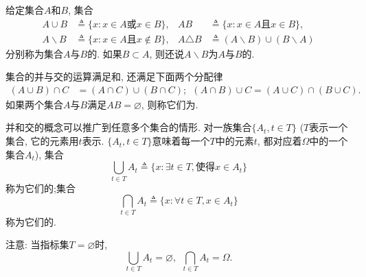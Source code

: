 给定集合$A$和$B$, 集合
\begin{align}
A\cup B &\triangleq \{ x: x\in A\text{或} x\in B\},&AB &\triangleq \{ x: x\in A\text{且} x\in B\},\nonumber\\
A\backslash B &\triangleq \{ x:x\in A\text{且}x\notin B \},&A\triangle B &\triangleq (A\backslash B)\cup(B\backslash A)
\end{align}
分别称为集合$A$与$B$的. 如果$B\subset A$, 则还说$A\backslash B$为$A$与$B$的.

集合的并与交的运算满足和, 还满足下面两个分配律\begin{align}
(A\cup B)\cap C &= (A\cap C)\cup (B\cap C);~~(A\cap B)\cup C = (A\cup C)\cap (B\cup C).
\end{align}
如果两个集合$A$与$B$满足$AB = \varnothing$, 则称它们为.

并和交的概念可以推广到任意多个集合的情形. 对一族集合$\{A_t,t\in T\}$ ($T$表示一个集合, 它的元素用$t$表示. $\{A_t,t\in T\}$意味着每一个$T$中的元素$t$, 都对应着$\Omega$中的一个集合$A_t$), 集合
\begin{equation}
\bigcup_{t\in T}A_t \triangleq \{ x:\exists t\in T,\text{使得} x\in A_t \}
\end{equation}
称为它们的;集合
\begin{equation}
\bigcap_{t\in T}A_t \triangleq \{ x:\forall t\in T, x\in A_t \}
\end{equation}
称为它们的. 
\begin{note}
	注意: 当指标集$T = \varnothing$时, \begin{equation}
		\bigcup_{t\in T}A_t = \varnothing,~~\bigcap_{t\in T}A_t = \Omega.
	\end{equation}
\end{note}

